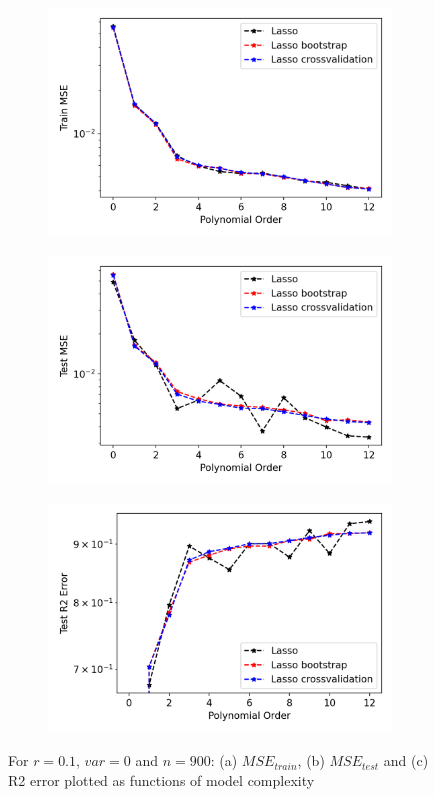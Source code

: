 \begin{figure}
\centering
\begin{subfigure}{.5\textwidth}
  \centering
  \includegraphics[width=.9\linewidth]{Images/lasso9.png}
  \caption{}
  \label{fig:lasso9}
\end{subfigure}%
\begin{subfigure}{.5\textwidth}
  \centering
  \includegraphics[width=.9\linewidth]{Images/lasso8.png}
  \caption{}
  \label{fig:lasso8}
\end{subfigure}
\begin{subfigure}{.5\textwidth}
  \centering
  \includegraphics[width=.9\linewidth]{Images/lasso10.png}
  \caption{}
  \label{fig:lasso10}
\end{subfigure}
\caption{For $r=0.1$, $var=0$ and $n=900$: (a) $MSE_{train}$, (b) $MSE_{test}$ and (c) R2 error plotted as functions of model complexity}
\label{fig:lasso_resample}
\end{figure}



